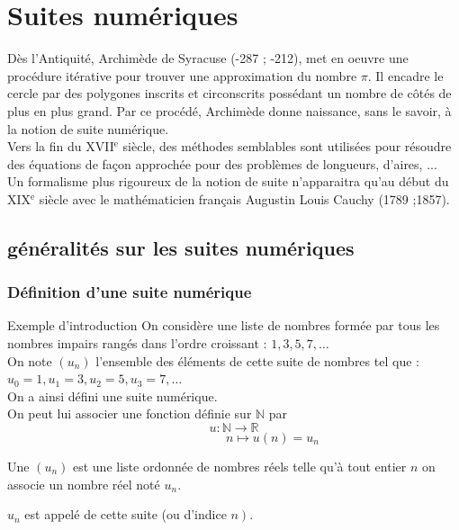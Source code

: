 \chapter{Suites numériques}
\thispagestyle{fancy}

\begin{bhistoire}
	Dès l'Antiquité, Archimède de Syracuse (-287 ; -212), met en oeuvre une procédure itérative pour trouver une approximation du nombre $\pi$. Il encadre le cercle par des polygones inscrits et circonscrits possédant un nombre de côtés de plus en plus grand. Par ce procédé,
	Archimède donne naissance, sans le savoir, à la notion de suite numérique.\\
	Vers la fin du XVII$^\text{e}$ siècle, des méthodes semblables sont utilisées pour résoudre des équations de façon approchée pour des problèmes de longueurs, d'aires, ...\\
	Un formalisme plus rigoureux de la notion de suite n'apparaitra qu'au début du XIX$^\text{e}$ siècle avec le mathématicien français Augustin Louis Cauchy (1789 ;1857).
\end{bhistoire}


\section{généralités sur les suites numériques}

\subsection{Définition d'une suite numérique}

\begin{bexemplet}{Exemple d'introduction}
	On considère une liste de nombres formée par tous les nombres impairs rangés dans l'ordre croissant : $1,3,5,7, \ldots$\\
	On note $\left(u_{n}\right)$ l'ensemble des éléments de cette suite de nombres tel que :\\
	$u_{0}=1, u_{1}=3, u_{2}=5, u_{3}=7, \ldots$\\
	On a ainsi défini une suite numérique.\\
	On peut lui associer une fonction définie sur $\mathbb{N}$ par 
	$$u: \mathbb{N} \rightarrow \mathbb{R}$$
	$$\phantom{......................}n \mapsto u(n)=u_{n}$$
	
\end{bexemplet}

\begin{bdefi}
	\begin{itemDef}
		\item Une  $\left(u_{n}\right)$ est une liste ordonnée de nombres réels telle qu'à tout entier $n$ on associe un nombre réel noté $u_{n}$.
		\item $u_{n}$ est appelé  de cette suite (ou d'indice $\left.n\right)$.
	\end{itemDef}
\end{bdefi}

